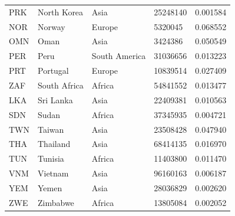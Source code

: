 \documentclass[11pt]{report}
\begin{document}
\begin{table}[]
\begin{tabular}{lllll}
            PRK                           & North Korea               & Asia                           & 25248140                      & 0.001584                           \\
            NOR                           & Norway                    & Europe                         & 5320045                       & 0.068552                           \\
            OMN                           & Oman                      & Asia                           & 3424386                       & 0.050549                           \\
            PER                           & Peru                      & South America                  & 31036656                      & 0.013223                           \\
            PRT                           & Portugal                  & Europe                         & 10839514                      & 0.027409                           \\
            ZAF                           & South Africa              & Africa                         & 54841552                      & 0.013477                           \\
            LKA                           & Sri Lanka                 & Asia                           & 22409381                      & 0.010563                           \\
            SDN                           & Sudan                     & Africa                         & 37345935                      & 0.004721                           \\
            TWN                           & Taiwan                    & Asia                           & 23508428                      & 0.047940                           \\
            THA                           & Thailand                  & Asia                           & 68414135                      & 0.016970                           \\
            TUN                           & Tunisia                   & Africa                         & 11403800                      & 0.011470                           \\
            VNM                           & Vietnam                   & Asia                           & 96160163                      & 0.006187                           \\
            YEM                           & Yemen                     & Asia                           & 28036829                      & 0.002620                           \\
            ZWE                           & Zimbabwe                  & Africa                         & 13805084                      & 0.002052
        \end{tabular}
    \end{table}
\end{document}
